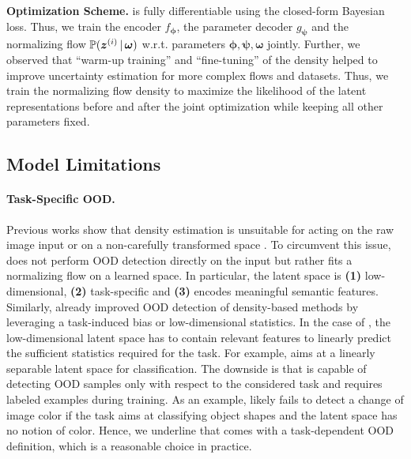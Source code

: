 \textbf{Optimization Scheme.} \NatPNacro{} is fully differentiable using the closed-form Bayesian loss. Thus, we train the encoder $f_{\bm{\phi}}$, the parameter decoder $g_{\bm{\psi}}$ and the normalizing flow $\operatorname{\mathbb{P}}(\bm{z}^{(i)} \,|\, \bm{\omega})$ w.r.t. parameters $\bm{\phi}, \bm{\psi}, \bm{\omega}$ jointly. Further, we observed that ``warm-up training'' \citep{warm-start} and ``fine-tuning'' \citep{fine-tuning-continuous} of the density helped to improve uncertainty estimation for more complex flows and datasets. Thus, we train the normalizing flow density to maximize the likelihood of the latent representations before and after the joint optimization while keeping all other parameters fixed.

\subsection{Model Limitations} \label{sec:limitations}

\paragraph{Task-Specific OOD.} Previous works show that density estimation is unsuitable for acting on the raw image input \citep{anomaly-detection,deep-generative,typicality_OOD_generative} or on a non-carefully transformed space \citep{perfect-density-no-ood-guarantee}. To circumvent this issue, \NatPNacro{} does not perform OOD detection directly on the input but rather fits a normalizing flow on a learned space. In particular, the latent space is \textbf{(1)} low-dimensional, \textbf{(2)} task-specific and \textbf{(3)} encodes meaningful semantic features. Similarly, \cite{charpentier2020, why-nf-fail-ood, density-states-ood, contrastive-ood} already improved OOD detection of density-based methods by leveraging a task-induced bias or low-dimensional statistics. In the case of \NatPNacro{}, the low-dimensional latent space has to contain relevant features to linearly predict the sufficient statistics required for the task. For example, \NatPNacro{} aims at a linearly separable latent space for classification. The downside is that \NatPNacro{} is capable of detecting OOD samples only with respect to the considered task and requires labeled examples during training. As an example, \NatPNacro{} likely fails to detect a change of image color if the task aims at classifying object shapes and the latent space has no notion of color. Hence, we underline that \NatPNacro{} comes with a task-dependent OOD definition, which is a reasonable choice in practice.


